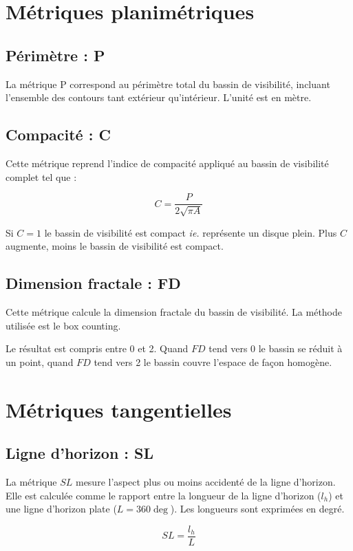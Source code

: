 \documentclass{report}
\begin{document}
\section{Métriques planimétriques}

\subsection{Périmètre : P}

La métrique P correspond au périmètre total du bassin de visibilité, incluant l'ensemble des contours tant extérieur qu'intérieur. L'unité est en mètre.


\subsection{Compacité : C}
Cette métrique reprend l'indice de compacité appliqué au bassin de visibilité complet tel que :

$$C=\frac{P}{2\sqrt{\pi A}}$$

Si $C=1$ le bassin de visibilité est compact \textit{ie.} représente un disque plein. Plus $C$ augmente, moins le bassin de visibilité est compact.


\subsection{Dimension fractale : FD}
Cette métrique calcule la dimension fractale du bassin de visibilité. La méthode utilisée est le box counting.

Le résultat est compris entre 0 et 2. Quand $FD$ tend vers 0 le bassin se réduit à un point, quand $FD$ tend vers 2 le bassin couvre l'espace de façon homogène.

\section{Métriques tangentielles}

\subsection{Ligne d'horizon : SL}

La métrique $SL$ mesure l'aspect plus ou moins accidenté de la ligne d'horizon. Elle est calculée comme le rapport entre la longueur de la ligne d'horizon ($l_h$) et une ligne d'horizon plate ($L=360\deg$). Les longueurs sont exprimées en degré. 

$$SL=\frac{l_h}{L}$$
\end{document}
